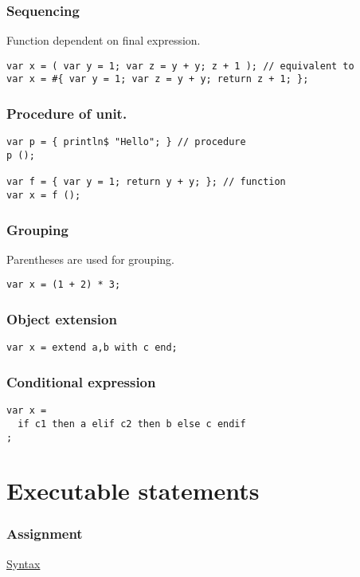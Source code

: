 \documentclass[oneside]{book}
\begin{document}
\section{Sequencing}
Function dependent on final expression.

\begin{verbatim}
var x = ( var y = 1; var z = y + y; z + 1 ); // equivalent to
var x = #{ var y = 1; var z = y + y; return z + 1; };
\end{verbatim}


\section{Procedure of unit.}

\begin{verbatim}
var p = { println$ "Hello"; } // procedure
p (); 

var f = { var y = 1; return y + y; }; // function
var x = f ();
\end{verbatim}


\section{Grouping}
Parentheses are used for grouping.

\begin{verbatim}
var x = (1 + 2) * 3;
\end{verbatim}


\section{Object extension}

\begin{verbatim}
var x = extend a,b with c end;
\end{verbatim}


\section{Conditional expression}

\begin{verbatim}
var x =
  if c1 then a elif c2 then b else c endif
;
\end{verbatim}


\part{Executable statements}
\section{Assignment}
\href{http://felix-lang.org/share/lib/grammar/assignment.fsyn}{Syntax}
\end{document}
